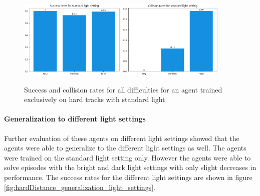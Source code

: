 \begin{figure}
    \centering
    \includegraphics[width=0.45\textwidth]{Bilder/notebook_images/hardDistanceStandardLight_eval_standard_success_rates_barplot.png}
    \includegraphics[width=0.45\textwidth]{Bilder/notebook_images/hardDistanceStandardLight_eval_standard_collision_rates_barplot.png}
    \caption{Success and collision rates for all difficulties for an agent trained exclusively on hard tracks with standard light}
    \label{fig:hardDistance_generalization}
\end{figure}

\paragraph{Generalization to different light settings}
Further evaluation of these agents on different light settings showed that the agents were able to generalize to the different light settings as well. The agents were trained on the standard light setting only. However the agents were able to solve episodes with the bright and dark light settings with only slight decreases in performance. The success rates for the different light settings are shown in figure \ref{fig:hardDistance_generalization_light_settings}.

